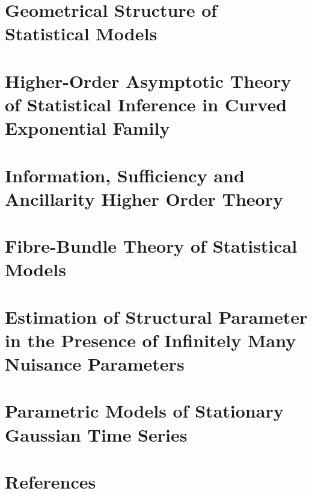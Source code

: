 \documentclass[11pt]{article}
\begin{document}
\section{Geometrical Structure of Statistical Models}

\section{Higher-Order Asymptotic Theory of Statistical Inference in Curved Exponential Family}

\section{Information, Sufficiency and Ancillarity Higher Order Theory}

\section{Fibre-Bundle Theory of Statistical Models}

\section{Estimation of Structural Parameter in the Presence of Infinitely Many Nuisance Parameters}

\section{Parametric Models of Stationary Gaussian Time Series}

\section{References}
\end{document}
